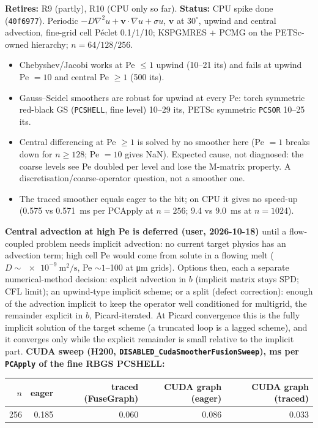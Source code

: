 \documentclass[11pt]{article}
\newcommand{\status}[1]{\textcolor{marlinteal}{\textbf{Status:}} #1}
\begin{document}
\textbf{Retires:} R9 (partly), R10 (CPU only so far). \status{CPU spike done
(\texttt{40f6977}). Periodic $-D\nabla^2u + \mathbf{v}\cdot\nabla u + \sigma u$,
$\mathbf{v}$ at $30^\circ$, upwind and central advection, fine-grid cell P\'eclet
0.1/1/10; KSPGMRES + PCMG on the PETSc-owned hierarchy; $n=64/128/256$.
\begin{itemize}[leftmargin=*]
\item Chebyshev/Jacobi works at Pe $\le 1$ upwind (10--21 its) and fails at upwind
Pe $=10$ and central Pe $\ge 1$ (500 its).
\item Gauss--Seidel smoothers are robust for upwind at every Pe: torch symmetric
red-black GS (\texttt{PCSHELL}, fine level) 10--29 its, PETSc symmetric
\texttt{PCSOR} 10--25 its.
\item Central differencing at Pe $\ge 1$ is solved by no smoother here (Pe $=1$
breaks down for $n\ge128$; Pe $=10$ gives NaN). Expected cause, not diagnosed:
the coarse levels see Pe doubled per level and lose the M-matrix property. A
discretisation/coarse-operator question, not a smoother one.
\item The traced smoother equals eager to the bit; on CPU it gives no speed-up
(0.575 vs 0.571~ms per PCApply at $n=256$; 9.4 vs 9.0~ms at $n=1024$).
\end{itemize}
\textbf{Central advection at high Pe is deferred (user, 2026-10-18)} until a
flow-coupled problem needs implicit advection: no current target physics has an
advection term; high cell Pe would come from solute in a flowing melt
($D\sim\SI{e-9}{\metre\squared\per\second}$, Pe $\sim1$--100 at \si{\micro\metre} grids). Options
then, each a separate numerical-method decision: explicit advection in $b$
(implicit matrix stays SPD; CFL limit); an upwind-type implicit scheme; or a
split (defect correction): enough of the advection implicit to keep the operator
well conditioned for multigrid, the remainder explicit in $b$, Picard-iterated.
At Picard convergence this is the fully implicit solution of the target scheme
(a truncated loop is a lagged scheme), and it converges only while the explicit
remainder is small relative to the implicit part.
\textbf{CUDA sweep (H200, \texttt{DISABLED\_CudaSmootherFusionSweep}), ms per
\texttt{PCApply} of the fine RBGS PCSHELL:}
\begin{center}
\begin{tabular}{rrrrr}
\toprule
$n$ & eager & traced (FuseGraph) & CUDA graph (eager) & CUDA graph (traced) \\
\midrule
256 & 0.185 & 0.060 & 0.086 & 0.033 \\

\end{tabular}
\end{center}}
\end{document}
